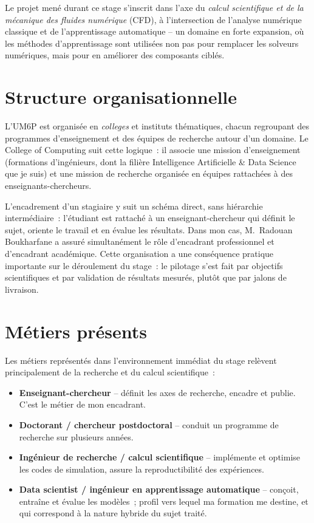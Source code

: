 \documentclass[12pt,a4paper,oneside]{report}
\begin{document}
Le projet mené durant ce stage s'inscrit dans l'axe du \emph{calcul
scientifique et de la mécanique des fluides numérique} (CFD), à l'intersection
de l'analyse numérique classique et de l'apprentissage automatique -- un
domaine en forte expansion, où les méthodes d'apprentissage sont utilisées non
pas pour remplacer les solveurs numériques, mais pour en améliorer des
composants ciblés.

\section{Structure organisationnelle}

L'UM6P est organisée en \emph{colleges} et instituts thématiques, chacun
regroupant des programmes d'enseignement et des équipes de recherche autour
d'un domaine. Le College of Computing suit cette logique~: il associe une
mission d'enseignement (formations d'ingénieurs, dont la filière Intelligence
Artificielle \& Data Science que je suis) et une mission de recherche organisée
en équipes rattachées à des enseignants-chercheurs.

L'encadrement d'un stagiaire y suit un schéma direct, sans hiérarchie
intermédiaire~: l'étudiant est rattaché à un enseignant-chercheur qui définit le
sujet, oriente le travail et en évalue les résultats. Dans mon cas,
M.~Radouan Boukharfane a assuré simultanément le rôle d'encadrant professionnel
et d'encadrant académique. Cette organisation a une conséquence pratique
importante sur le déroulement du stage~: le pilotage s'est fait par objectifs
scientifiques et par validation de résultats mesurés, plutôt que par jalons de
livraison.

\section{Métiers présents}

Les métiers représentés dans l'environnement immédiat du stage relèvent
principalement de la recherche et du calcul scientifique~:

\begin{itemize}
  \item \textbf{Enseignant-chercheur} -- définit les axes de recherche, encadre
  et publie. C'est le métier de mon encadrant.
  \item \textbf{Doctorant / chercheur postdoctoral} -- conduit un programme de
  recherche sur plusieurs années.
  \item \textbf{Ingénieur de recherche / calcul scientifique} -- implémente et
  optimise les codes de simulation, assure la reproductibilité des expériences.
  \item \textbf{Data scientist / ingénieur en apprentissage automatique} --
  conçoit, entraîne et évalue les modèles~; profil vers lequel ma formation me
  destine, et qui correspond à la nature hybride du sujet traité.
\end{itemize}
\end{document}
